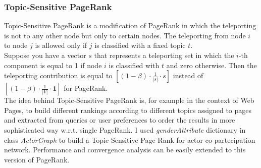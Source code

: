 \documentclass{article}
\begin{document}
\subsubsection{Topic-Sensitive PageRank}
Topic-Sensitive PageRank is a modification of PageRank in which the teleporting is not to any other node but only to certain nodes. The teleporting from node $i$ to node $j$ is allowed only if $j$ is classified with a fixed topic $t$. \\
Suppose you have a vector $s$ that represents a teleporting set in which the $i$-th component is equal to 1 if node $i$ is classified with $t$ and zero otherwise. Then the teleporting contribution is equal to $[(1-\beta)\cdot\frac{1}{|s|}\cdot s]$ instead of $[(1-\beta)\cdot\frac{1}{|V|}\cdot\mathbf{1}]$ for PageRank.\\
The idea behind Topic-Sensitive PageRank is, for example in the context of Web Pages, to build different rankings according to different topics assigned to pages and extracted from queries or user preferences to order the results in more sophisticated way w.r.t. single PageRank. I used \textit{genderAttribute} dictionary in class \textit{ActorGraph} to build a Topic-Sensitive Page Rank for actor co-partecipation network. Performance and convergence analysis can be easily extended to this version of PageRank.
\end{document}
